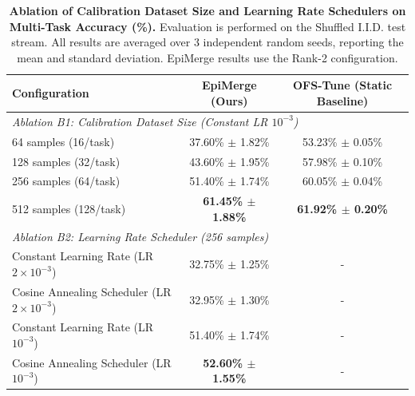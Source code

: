\begin{table}[h]
\centering
\caption{\textbf{Ablation of Calibration Dataset Size and Learning Rate Schedulers on Multi-Task Accuracy (\%).} Evaluation is performed on the Shuffled I.I.D. test stream. All results are averaged over 3 independent random seeds, reporting the mean and standard deviation. EpiMerge results use the Rank-2 configuration.}
\label{tab:ablation_dataset_lr}
\vskip 0.15in
\begin{tabular}{lcc}
\toprule
\textbf{Configuration} & \textbf{EpiMerge (Ours)} & \textbf{OFS-Tune (Static Baseline)} \\
\midrule
\multicolumn{3}{l}{\textit{Ablation B1: Calibration Dataset Size (Constant LR $10^{-3}$)}}\\
64 samples (16/task) & 37.60\% $\pm$ 1.82\% & 53.23\% $\pm$ 0.05\% \\
128 samples (32/task) & 43.60\% $\pm$ 1.95\% & 57.98\% $\pm$ 0.10\% \\
256 samples (64/task) & 51.40\% $\pm$ 1.74\% & 60.05\% $\pm$ 0.04\% \\
512 samples (128/task) & \textbf{61.45\% $\pm$ 1.88\%} & \textbf{61.92\% $\pm$ 0.20\%} \\
\midrule
\multicolumn{3}{l}{\textit{Ablation B2: Learning Rate Scheduler (256 samples)}}\\
Constant Learning Rate (LR $2 \times 10^{-3}$) & 32.75\% $\pm$ 1.25\% & - \\
Cosine Annealing Scheduler (LR $2 \times 10^{-3}$) & 32.95\% $\pm$ 1.30\% & - \\
Constant Learning Rate (LR $10^{-3}$) & 51.40\% $\pm$ 1.74\% & - \\
Cosine Annealing Scheduler (LR $10^{-3}$) & \textbf{52.60\% $\pm$ 1.55\%} & - \\
\bottomrule
\end{tabular}
\end{table}

